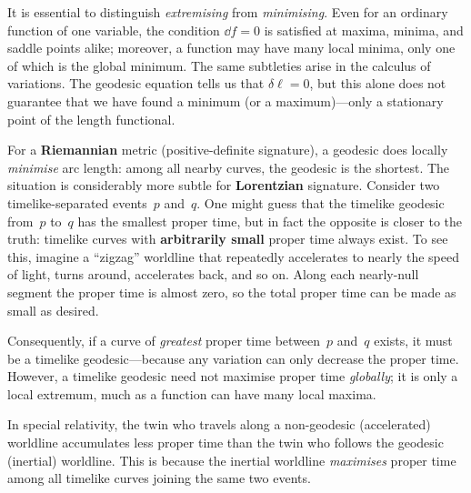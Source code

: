 \begin{remark}
  It is essential to distinguish \emph{extremising} from
  \emph{minimising}.  Even for an ordinary function of one
  variable, the condition $\dd f = 0$ is satisfied at maxima,
  minima, and saddle points alike; moreover, a function may have
  many local minima, only one of which is the global minimum.
  The same subtleties arise in the calculus of variations.
  The geodesic equation tells us that $\delta\ell = 0$, but
  this alone does not guarantee that we have found a minimum (or
  a maximum)---only a stationary point of the length functional.

  For a \textbf{Riemannian} metric (positive-definite signature),
  a geodesic does locally \emph{minimise} arc length: among all
  nearby curves, the geodesic is the shortest.  The situation is
  considerably more subtle for \textbf{Lorentzian} signature.
  Consider two timelike-separated events~$p$ and~$q$.  One might
  guess that the timelike geodesic from~$p$ to~$q$ has the
  smallest proper time, but in fact the opposite is closer to the
  truth: timelike curves with \textbf{arbitrarily small} proper
  time always exist.  To see this, imagine a ``zigzag'' worldline
  that repeatedly accelerates to nearly the speed of light, turns
  around, accelerates back, and so on.  Along each nearly-null
  segment the proper time is almost zero, so the total proper
  time can be made as small as desired.

  Consequently, if a curve of \emph{greatest} proper time
  between~$p$ and~$q$ exists, it must be a timelike
  geodesic---because any variation can only decrease the proper
  time.  However, a timelike geodesic need not maximise proper
  time \emph{globally}; it is only a local extremum, much as a
  function can have many local maxima.
\end{remark}

\begin{intuition}
  In special relativity, the twin who travels along a
  non-geodesic (accelerated) worldline accumulates less proper
  time than the twin who follows the geodesic (inertial)
  worldline.  This is because the inertial worldline
  \emph{maximises} proper time among all timelike curves joining
  the same two events.
\end{intuition}


